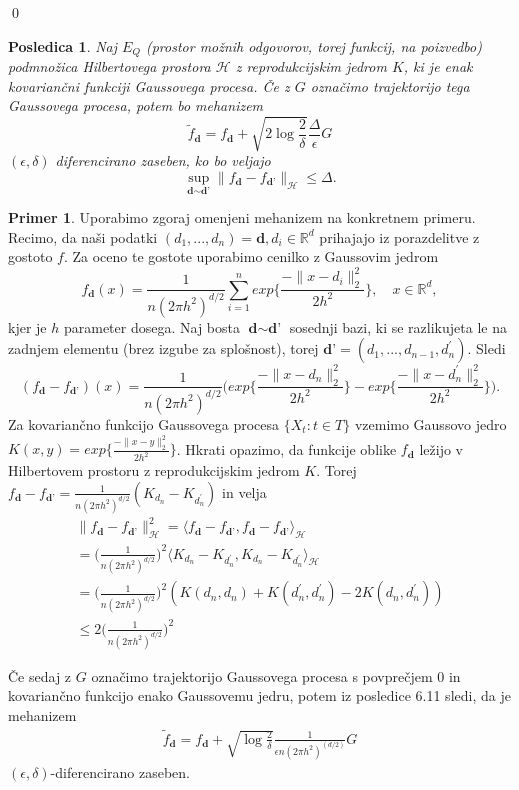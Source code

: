\documentclass[12pt,a4paper]{amsart}
\theoremstyle{definition} %
\newtheorem{primer}[definicija]{Primer}
\theoremstyle{plain} %
\newtheorem{posledica}[definicija]{Posledica}
\begin{document}
\qed
\begin{posledica}
Naj $E_Q$ (prostor možnih odgovorov, torej funkcij, na poizvedbo) podmnožica Hilbertovega prostora $\mathcal{H}$ z reprodukcijskim jedrom $K$, ki je enak kovariančni funkciji Gaussovega procesa. Če z $G$ označimo trajektorijo tega Gaussovega procesa, potem bo mehanizem 
$$
\widetilde{f}_{\textbf{d}} = f_{\textbf{d}} + \sqrt{2\log{\frac{2}{\delta}}} \frac{\Delta}{\epsilon}G
$$
$(\epsilon,\delta)$ diferencirano zaseben, ko bo veljajo 
$$
\sup_{\textbf{d} \sim \textbf{d'}} \| f_{\textbf{d}} -  f_{\textbf{d'}} \|_{\mathcal{H}} \leq \Delta.
$$
\end{posledica}
 
\begin{primer}
Uporabimo zgoraj omenjeni mehanizem na konkretnem primeru. Recimo, da naši podatki $(d_1,...,d_n) = \textbf{d}, d_i \in \mathbb{R}^d$ prihajajo iz porazdelitve z gostoto $f$. Za oceno te gostote uporabimo cenilko z Gaussovim jedrom
$$
f_{\textbf{d}}(x) = \frac{1}{n(2\pi h^2)^{d/2}} \sum_{i=1}^{n} exp\Big\{\frac{-\|x-d_i\|_{2}^{2}}{2h^2}\Big\},  \quad x \in \mathbb{R}^d,
$$
kjer je $h$ parameter dosega. Naj bosta $\textbf{d} \sim \textbf{d'}$ sosednji bazi, ki se razlikujeta le na zadnjem elementu (brez izgube za splošnost), torej $\textbf{d'} = (d_1,...,d_{n-1},d_{n}^{\prime}) $. Sledi
$$
(f_{\textbf{d}} - f_{\textbf{d'}})(x) = \frac{1}{n(2\pi h^2)^{d/2}} \Big(exp\Big\{\frac{-\|x-d_n\|_{2}^{2}}{2h^2}\Big\}-exp\Big\{\frac{-\|x-d_{n}^{\prime}\|_{2}^{2}}{2h^2}\Big\}\Big).
$$
Za kovariančno funkcijo Gaussovega procesa $\{X_t : t \in T \}$ vzemimo Gaussovo jedro $K(x,y) = exp\{\frac{-\|x-y\|_{2}^{2}}{2h^2}\}$. Hkrati opazimo, da funkcije oblike $f_{\textbf{d}}$ ležijo v Hilbertovem prostoru z reprodukcijskim jedrom $K$. Torej $f_{\textbf{d}} - f_{\textbf{d'}} = \frac{1}{n(2\pi h^2)^{d/2}} (K_{d_n}-K_{d_{n}^{\prime}})$ in velja 
\begin{gather*}
\|f_{\textbf{d}} - f_{\textbf{d'}}\|_{\mathcal{H}}^{2} = \langle f_{\textbf{d}} - f_{\textbf{d'}}, f_{\textbf{d}} - f_{\textbf{d'}} \rangle_{\mathcal{H}}  \\ 
= \Big(\frac{1}{n(2\pi h^2)^{d/2}}\Big)^2 \langle K_{d_n}-K_{d_{n}^{\prime}}, K_{d_n}-K_{d_{n}^{\prime}} \rangle_{\mathcal{H}}  \\
= \Big(\frac{1}{n(2\pi h^2)^{d/2}}\Big)^2 (K(d_n, d_n)+K(d_{n}^{\prime}, d_{n}^{\prime})-2K(d_n, d_{n}^{\prime})) \\ 
\leq 2 \Big(\frac{1}{n(2\pi h^2)^{d/2}}\Big)^2
\end{gather*}

Če sedaj z $G$ označimo trajektorijo Gaussovega procesa s povprečjem 0 in kovariančno funkcijo enako Gaussovemu jedru, potem iz posledice 6.11 sledi, da je mehanizem 
\begin{gather*}
\widetilde{f}_{\textbf{d}} = f_{\textbf{d}} + \sqrt{\log{\frac{2}{\delta}}} \frac{1}{\epsilon n (2\pi h^2)^{(d/2)}}G
\end{gather*}
$(\epsilon, \delta)$-diferencirano zaseben.
\end{primer}
\end{document}
